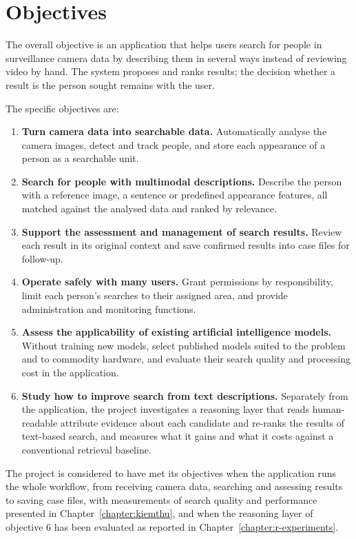 \section{Objectives}
\label{sec:1.2}

The overall objective is an application that helps users search for people in surveillance camera data by describing them in several ways instead of reviewing video by hand. The system proposes and ranks results; the decision whether a result is the person sought remains with the user.

The specific objectives are:

\begin{enumerate}
    \item \textbf{Turn camera data into searchable data.} Automatically analyse the camera images, detect and track people, and store each appearance of a person as a searchable unit.

    \item \textbf{Search for people with multimodal descriptions.} Describe the person with a reference image, a sentence or predefined appearance features, all matched against the analysed data and ranked by relevance.

    \item \textbf{Support the assessment and management of search results.} Review each result in its original context and save confirmed results into case files for follow-up.

    \item \textbf{Operate safely with many users.} Grant permissions by responsibility, limit each person's searches to their assigned area, and provide administration and monitoring functions.

    \item \textbf{Assess the applicability of existing artificial intelligence models.} Without training new models, select published models suited to the problem and to commodity hardware, and evaluate their search quality and processing cost in the application.

    \item \textbf{Study how to improve search from text descriptions.} Separately from the application, the project investigates a reasoning layer that reads human-readable attribute evidence about each candidate and re-ranks the results of text-based search, and measures what it gains and what it costs against a conventional retrieval baseline.
\end{enumerate}

The project is considered to have met its objectives when the application runs the whole workflow, from receiving camera data, searching and assessing results to saving case files, with measurements of search quality and performance presented in Chapter~\ref{chapter:kiemthu}, and when the reasoning layer of objective 6 has been evaluated as reported in Chapter~\ref{chapter:r-experiments}.
